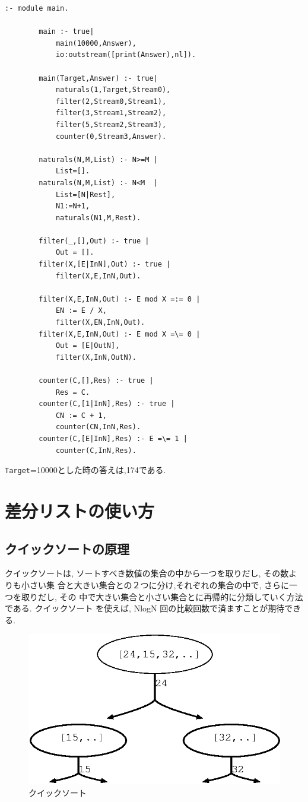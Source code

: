 \documentclass[a4,titlepage]{jsreport}
\newenvironment{program}{\begin{quote}}{\end{quote}}
\begin{document}
\begin{Verbatim}[baselinestretch=0.8]
        :- module main.

        main :- true|
            main(10000,Answer),
            io:outstream([print(Answer),nl]).

        main(Target,Answer) :- true|
            naturals(1,Target,Stream0),
            filter(2,Stream0,Stream1),
            filter(3,Stream1,Stream2),
            filter(5,Stream2,Stream3),
            counter(0,Stream3,Answer).

        naturals(N,M,List) :- N>=M |
            List=[].
        naturals(N,M,List) :- N<M  |
            List=[N|Rest],
            N1:=N+1,
            naturals(N1,M,Rest).

        filter(_,[],Out) :- true |
            Out = [].
        filter(X,[E|InN],Out) :- true |
            filter(X,E,InN,Out).

        filter(X,E,InN,Out) :- E mod X =:= 0 |
            EN := E / X,
            filter(X,EN,InN,Out).
        filter(X,E,InN,Out) :- E mod X =\= 0 |
            Out = [E|OutN],
            filter(X,InN,OutN).

        counter(C,[],Res) :- true |
            Res = C.
        counter(C,[1|InN],Res) :- true |
            CN := C + 1,
            counter(CN,InN,Res).
        counter(C,[E|InN],Res) :- E =\= 1 |
            counter(C,InN,Res).
\end{Verbatim}

\verb!Target!=10000とした時の答えは,174である.  

\chapter{差分リストの使い方}
\section{クイックソートの原理}
クイックソートは, ソートすべき数値の集合の中から一つを取りだし, 
その数よりも小さい集
合と大きい集合との２つに分け,それぞれの集合の中で, さらに一つを取りだし, その
中で大きい集合と小さい集合とに再帰的に分類していく方法である. クイックソート
を使えば,  NlogN 回の比較回数で済ますことが期待できる.  \par

\begin{figure}[htbp]
  \begin{center}
\includegraphics[width=.5\textwidth]{fig/dlt1.eps}
    \caption{クイックソート}
  \end{center}
\end{figure}
\end{document}
